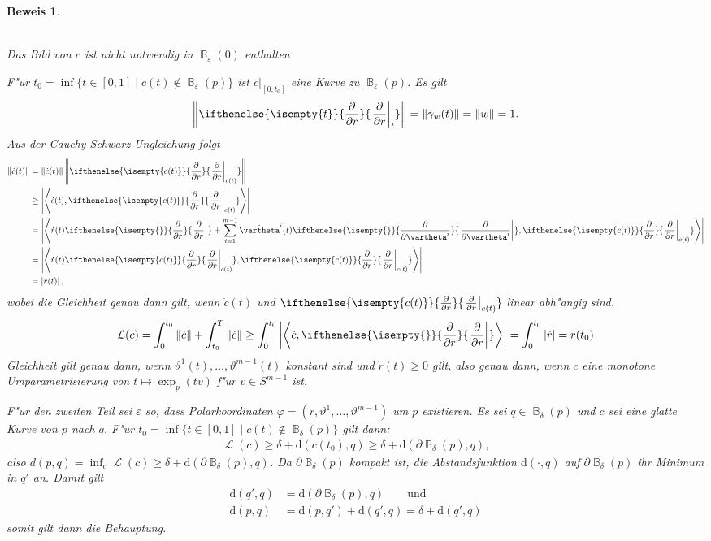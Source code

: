 \documentclass[paper=A4, twoside, chapterprefix=true, bibliography=totoc, headsepline]{scrbook}
\let\temp\phi
\let\phi\varphi
\let\varphi\temp
\let\temp\theta
\let\theta\vartheta
\let\vartheta\temp
\let\temp\epsilon
\let\epsilon\varepsilon
\let\varepsilon\temp
\let\temp\rho
\let\rho\varrho
\let\varrho\temp
\DeclareMathOperator{\B}{\mathbb{B}} %
\DeclareMathOperator{\calL}{\mathcal{L}}
\newcommand{\dop}{\mathrm{d}}
\newcommand{\pdifffrac}[3][]{\ifthenelse{\isempty{#1}}{\frac{\partial #2}{\partial #3}}{\left. \frac{\partial #2}{\partial #3} \right|_{#1}}}
\theoremstyle{plain}
\theoremstyle{nonumberplain}
\newtheorem{bew}{Beweis}
\theoremstyle{empty}
\theoremstyle{break}
\begin{document}
\begin{bew}
\begin{center}
\\
    Das Bild von $c$ ist nicht notwendig in $\B_\epsilon(0)$ enthalten
  \end{center}
  F"ur $t_0 = \inf\{t \in [0,1] \mid c(t) \notin \B_{\epsilon}(p)\}$ ist $c|_{[0,t_0]}$ eine Kurve zu $\B_{\epsilon}(p)$.
  Es gilt
  \begin{align*}
    \left\|\pdifffrac[t]{}{r}\right\| = \|\dot\gamma_w(t)\| = \|w\| = 1.
  \end{align*}
  Aus der Cauchy-Schwarz-Ungleichung folgt
  \begin{align*}
    \|\dot c(t)\| & = \|\dot c(t)\|\left\|\pdifffrac[c(t)]{}{r}\right\|\\
    & \geq \left|\left< \dot c(t), \pdifffrac[c(t)]{}{r}\right>\right|\\
    & = \left|\left<\dot r(t) \pdifffrac{}{r} + \sum_{i=1}^{m-1}\dot\theta^i(t)\pdifffrac{}{\theta^i},\pdifffrac[c(t)]{}{r}\right>\right|\\
    & = \left|\left<\dot r(t)\pdifffrac[c(t)]{}{r}, \pdifffrac[c(t)]{}{r}\right>\right|\\
    & = \left|\dot r(t)\right|,
  \end{align*}
  wobei die Gleichheit genau dann gilt, wenn $\dot c(t)$ und $\pdifffrac[c(t)]{}{r}$ linear abh"angig sind.
  \begin{align*}
    \mathcal L(c) = \int_0^{t_0}\|\dot c\| + \int_{t_0}^T\|\dot c\| \geq \int_0^{t_0} \left|\left<\dot c,\pdifffrac{}{r}\right>\right| = \int_0^{t_0}|\dot r| = r(t_0)
  \end{align*}
  Gleichheit gilt genau dann, wenn $\theta^1(t), \ldots, \theta^{m-1}(t)$ konstant sind und $\dot r(t) \geq 0$ gilt, also genau dann, wenn $c$ eine monotone Umparametrisierung von $t \mapsto \exp_p(tv)$ f"ur $v \in S^{m-1}$ ist.

  F"ur den zweiten Teil sei $\epsilon$ so, dass Polarkoordinaten $\phi=(r, \theta^1,\ldots ,\theta^{m-1})$ um $p$ existieren.
  Es sei $q \in \B_\delta(p)$ und $c$ sei eine glatte Kurve von $p$ nach $q$.
  F"ur $t_0 = \inf \{ t \in [0,1] \mid c(t) \notin \B_\delta(p) \}$ gilt dann:
  \begin{align*}
    \calL(c) \ge \delta + \dop(c(t_0), q) \ge \delta + \dop(\partial \B_\delta(p), q),
  \end{align*}
  also $d(p,q) = \inf_c \calL(c) \ge \delta + \dop(\partial \B_\delta(p), q)$. Da $\partial \B_\delta(p)$ kompakt ist, die Abstandsfunktion $\dop(\cdot, q)$ auf $\partial \B_\delta(p)$ ihr Minimum in $q'$ an. Damit gilt
  \begin{align*}
    \dop(q',q) &= \dop(\partial \B_\delta(p), q) \qquad \text{und}\\
    \dop(p,q) &= \dop(p,q') + \dop(q',q) = \delta + \dop(q',q)
  \end{align*}
  somit gilt dann die Behauptung.
\end{bew}
\end{document}
